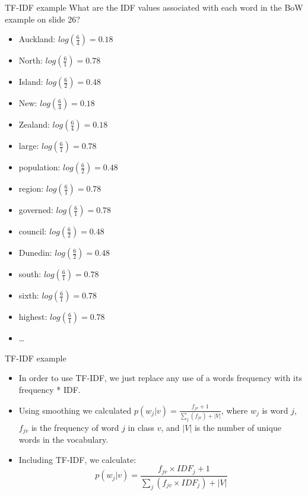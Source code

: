 \documentclass[aspectratio=169, 10pt]{beamer}
\begin{document}
\begin{frame}{TF-IDF example}
What are the IDF values associated with each word in the BoW example on slide 26?
\pause
    \begin{itemize}
        \item Auckland: $log(\frac{6}{4}) = 0.18$
        \item North: $log(\frac{6}{1}) = 0.78$
        \item Island: $log(\frac{6}{2}) = 0.48$
        \item New: $log(\frac{6}{4}) = 0.18$
        \item Zealand: $log(\frac{6}{4}) = 0.18$
        \item large: $log(\frac{6}{1}) = 0.78$
        \item population: $log(\frac{6}{2}) = 0.48$
        \item region: $log(\frac{6}{1}) = 0.78$
        \item governed: $log(\frac{6}{1}) = 0.78$
        \item council: $log(\frac{6}{2}) = 0.48$
        \item Dunedin: $log(\frac{6}{2}) = 0.48$
        \item south: $log(\frac{6}{1}) = 0.78$
        \item sixth: $log(\frac{6}{1}) = 0.78$
        \item highest: $log(\frac{6}{1}) = 0.78$
        \item \dots
    \end{itemize}
\end{frame}

\begin{frame}{TF-IDF example}
\begin{itemize}
    \item In order to use TF-IDF, we just replace any use of a words frequency with its frequency * IDF.
    \item Using smoothing we calculated $p(w_j|v) = \frac{f_{jv} + 1}{\sum_j(f_{jv}) +|V|}$, where $w_j$ is word $j$, $f_{jv}$ is the frequency of word $j$ in class $v$, and $|V|$ is the number of unique words in the vocabulary.
    \item Including TF-IDF, we calculate: $$
        p(w_j|v) = \frac{f_{jv}\times IDF_j + 1}{\sum_j(f_{jv}\times IDF_j) +|V|}
    $$
\end{itemize}
\end{frame}
\end{document}
